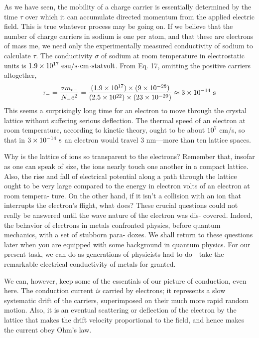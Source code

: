 As we have seen, the mobility of a charge carrier is essentially determined
by the time $\tau$ over which it can accumulate directed
momentum from the applied electric field. This is true whatever
process may be going on. If we believe that the number of charge
carriers in sodium is one per atom, and that these are electrons of
mass me, we need only the experimentally measured conductivity of
sodium to calculate $\tau$. The conductivity $\sigma$ of sodium at room
temperature in electrostatic units is $1.9 \times 10^{17}\ \esu/\sunit\unitdot\cmunit\unitdot\zu{statvolt}$.
From Eq. 17, omitting the positive carriers altogether,
\begin{equation}
  \tau_- = \frac{\sigma m_{e-}}{N_-e^2}
         = \frac{(1.9\times10^{17})\times(9\times10^{-28})}{(2.5\times10^{22})\times(23\times10^{-20})}
         \approx 3\times10^{-14}\ \textup{s}
\end{equation}
This seems a surprisingly long time for an electron to move through
the crystal lattice without suffering serious deflection. The thermal
speed of an electron at room temperature, according to kinetic
theory, ought to be about $10^7$ cm/s, so that in $3 \times 10^{-14}\ \sunit$ an
electron would travel 3 nm---more than ten lattice spaces.

Why is the lattice of ions so transparent to the electrons? Remember
that, insofar as one can speak of size, the ions nearly touch one
another in a compact lattice. Also, the rise and fall of electrical
potential along a path through the lattice ought to be very large compared
to the energy in electron volts of an electron at room tempera-
ture. On the other hand, if it isn't a collision with an ion that interrupts
the electron's ffight, what does? These crucial questions could
not really be answered until the wave nature of the electron was dis-
covered. Indeed, the behavior of electrons in metals confronted
physics, before quantum mechanics, with a set of stubborn para-
doxes. We shall return to these questions later when you are
equipped with some background in quantum physics. For our
present task, we can do as generations of physicists had to do---take
the remarkable electrical conductivity of metals for granted.

We can, however, keep some of the essentials of our picture of
conduction, even here. The conduction current \emph{is} carried by electrons;
it represents a slow systematic drift of the carriers, superimposed
on their much more rapid random motion. Also, it is an
eventual scattering or deflection of the electron by the lattice that
makes the drift velocity proportional to the field, and hence makes
the current obey Ohm's law.

